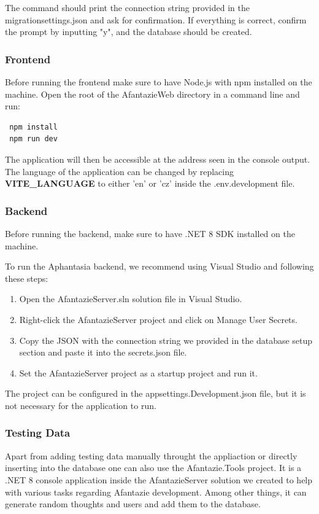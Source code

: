 The command should print the connection string provided in the migrationsettings.json and ask for confirmation.
If everything is correct, confirm the prompt by inputting "y", and the database should be created.

\subsubsection{Frontend}
Before running the frontend make sure to have Node.js with npm installed on the machine.
Open the root of the AfantazieWeb directory in a command line and run:
\begin{lstlisting}
 npm install
 npm run dev
\end{lstlisting}

The application will then be accessible at the address seen in the console output.
The language of the application can be changed by replacing \textbf{VITE\_LANGUAGE} to either 'en' or 'cz' inside the .env.development file.

\subsubsection{Backend}
Before running the backend, make sure to have .NET 8 SDK installed on the machine.

To run the Aphantasia backend, we recommend using Visual Studio and following these steps:
\begin{enumerate}
  \item Open the AfantazieServer.sln solution file in Visual Studio.
  \item Right-click the AfantazieServer project and click on Manage User Secrets.
  \item Copy the JSON with the connection string we provided in the database setup section and paste it into the secrets.json file.
  \item Set the AfantazieServer project as a startup project and run it.
\end{enumerate}

The project can be configured in the appsettings.Development.json file,
but it is not necessary for the application to run.

\subsubsection{Testing Data}
\label{sec:testing_data}
Apart from adding testing data manually throught the appliaction or directly inserting into the database one can also use the Afantazie.Tools project.
It is a .NET 8 console application inside the AfantazieServer solution
we created to help with various tasks regarding Afantazie development.
Among other things, it can generate random thoughts and users and add them to the database.

